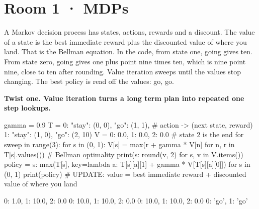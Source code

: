 \documentclass[11pt,a4paper]{report}
\begin{document}
\section*{Room 1 · MDPs}
A Markov decision process has states, actions, rewards and a discount. The value of a state is the best immediate reward plus the discounted value of where you land. That is the Bellman equation. In the code, from state one, going gives ten. From state zero, going gives one plus point nine times ten, which is nine point nine, close to ten after rounding. Value iteration sweeps until the values stop changing. The best policy is read off the values: go, go.
\begin{tcolorbox}[colback=yellow!12,colframe=orange!70!black,boxrule=0.4pt,left=4pt,right=4pt,top=2pt,bottom=2pt]\textbf{Twist one. Value iteration turns a long term plan into repeated one step lookups.}\end{tcolorbox}
\begin{Code}
gamma = 0.9
T = {0: {"stay": (0, 0), "go": (1, 1)},     # action -> (next state, reward)
     1: {"stay": (1, 0), "go": (2, 10)}}
V = {0: 0.0, 1: 0.0, 2: 0.0}                # state 2 is the end
for sweep in range(3):
    for s in (0, 1):
        V[s] = max(r + gamma * V[n] for n, r in T[s].values())    # Bellman optimality
    print({s: round(v, 2) for s, v in V.items()})
policy = {s: max(T[s], key=lambda a: T[s][a][1] + gamma * V[T[s][a][0]]) for s in (0, 1)}
print(policy)
# UPDATE: value = best immediate reward + discounted value of where you land
\end{Code}
\begin{Out}
{0: 1.0, 1: 10.0, 2: 0.0}
{0: 10.0, 1: 10.0, 2: 0.0}
{0: 10.0, 1: 10.0, 2: 0.0}
{0: 'go', 1: 'go'}
\end{Out}
\end{document}
